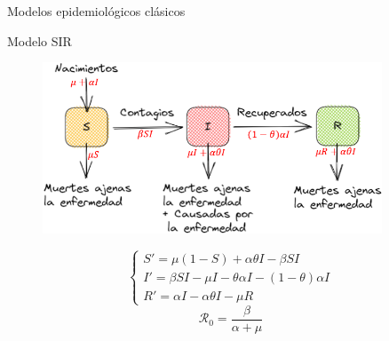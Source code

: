 \documentclass[9pt]{beamer}
\begin{document}
\begin{frame}{Modelos epidemiológicos clásicos}
\begin{minipage}{0.47\textwidth}
\begin{block}{Modelo SIR}
\begin{figure}[h]
        \centering
        \includegraphics[width=0.9\textwidth]{Imagenes/SIR_compartimientos.PNG}
        \label{fig:diagrama SIR}
    \end{figure}
    \begin{equation*}\label{eq:Modelo SIR}
    \left\{\begin{array}{l}
        S' = \mu(1 - S) + \alpha\theta I - \beta S I \\
        I' = \beta S I - \mu I - \theta\alpha I - (1 - \theta)\alpha I \\
        R' = \alpha I - \alpha\theta I - \mu R
    \end{array}\right.
    \end{equation*}
    \begin{equation*}
        \mathcal{R}_0 = \frac{\beta}{\alpha+\mu}
    \end{equation*}
\end{block}
\end{minipage}
\end{frame}
\end{document}
